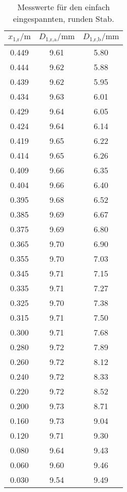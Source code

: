 \begin{table}[h]
  \centering
  \caption{Messwerte für den einfach eingespannten, runden Stab.}
  \label{tab:Rundein}
  \begin{tabular}{c c c}
    \toprule
    $x_\text{1,r}/\si{\meter}$ & $D_\text{1,r,a}/\si{\milli\meter}$ &
    $D_\text{1,r,b}/\si{\milli\meter}$ \\
    \midrule
    0.449 & 9.61 & 5.80 \\
    0.444 & 9.62 & 5.88 \\
    0.439 & 9.62 & 5.95 \\
    0.434 & 9.63 & 6.01 \\
    0.429 & 9.64 & 6.05 \\
    0.424 & 9.64 & 6.14 \\
    0.419 & 9.65 & 6.22 \\
    0.414 & 9.65 & 6.26 \\
    0.409 & 9.66 & 6.35 \\
    0.404 & 9.66 & 6.40 \\
    0.395 & 9.68 & 6.52 \\
    0.385 & 9.69 & 6.67 \\
    0.375 & 9.69 & 6.80 \\
    0.365 & 9.70 & 6.90 \\
    0.355 & 9.70 & 7.03 \\
    0.345 & 9.71 & 7.15 \\
    0.335 & 9.71 & 7.27 \\
    0.325 & 9.70 & 7.38 \\
    0.315 & 9.71 & 7.50 \\
    0.300 & 9.71 & 7.68 \\
    0.280 & 9.72 & 7.89 \\
    0.260 & 9.72 & 8.12 \\
    0.240 & 9.72 & 8.33 \\
    0.220 & 9.72 & 8.52 \\
    0.200 & 9.73 & 8.71 \\
    0.160 & 9.73 & 9.04 \\
    0.120 & 9.71 & 9.30 \\
    0.080 & 9.64 & 9.43 \\
    0.060 & 9.60 & 9.46 \\
    0.030 & 9.54 & 9.49 \\
    \bottomrule
  \end{tabular}
\end{table}

